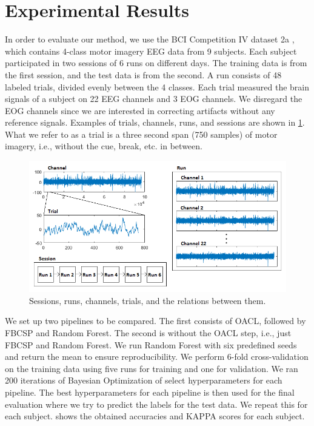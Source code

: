 \section{Experimental Results}

In order to evaluate our method, we use the BCI Competition IV dataset 2a \citep{brunner2008bci}, which contains 4-class motor imagery EEG data from 9 subjects. Each subject participated in two sessions of 6 runs on different days. The training data is from the first session, and the test data is from the second. A run consists of 48 labeled trials, divided evenly between the 4 classes. Each trial measured the brain signals of a subject on 22 EEG channels and 3 EOG channels. We disregard the EOG channels since we are interested in correcting artifacts without any reference signals. Examples of trials, channels, runs, and sessions are shown in \cref{fig:dataset}. What we refer to as a trial is a three second span (750 samples) of motor imagery, i.e., without the cue, break, etc. in between.

\begin{figure}
	\centering
	\begin{adjustbox}{width=\textwidth}
		\includegraphics{figures/bciiv2a.png}
	\end{adjustbox}
	\caption{Sessions, runs, channels, trials, and the relations between them.}
	\label{fig:dataset}
\end{figure}

We set up two pipelines to be compared. The first consists of OACL, followed by FBCSP and Random Forest. The second is without the OACL step, i.e., just FBCSP and Random Forest. We run Random Forest with six predefined seeds and return the mean to ensure reproducibility. We perform 6-fold cross-validation on the training data using five runs for training and one for validation. We ran 200 iterations of Bayesian Optimization of select hyperparameters for each pipeline. The best hyperparameters for each pipeline is then used for the final evaluation where we try to predict the labels for the test data. We repeat this for each subject.  shows the obtained accuracies and KAPPA scores for each subject.

